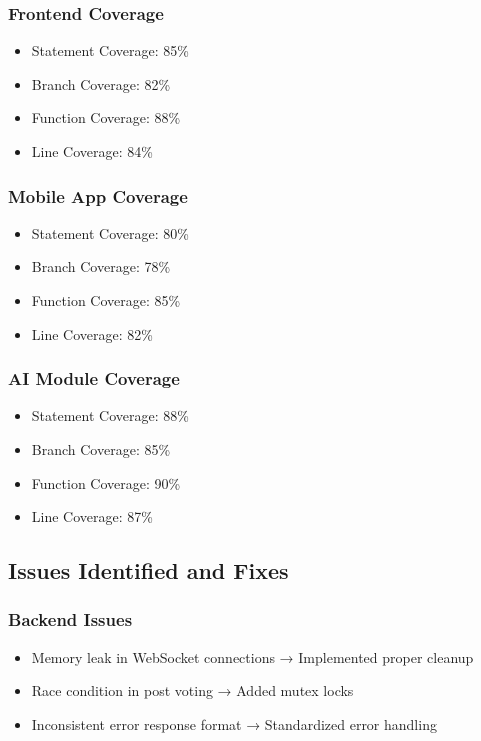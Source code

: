\subsubsection{Frontend Coverage}
\begin{itemize}
    \item Statement Coverage: 85\%
    \item Branch Coverage: 82\%
    \item Function Coverage: 88\%
    \item Line Coverage: 84\%
\end{itemize}

\subsubsection{Mobile App Coverage}
\begin{itemize}
    \item Statement Coverage: 80\%
    \item Branch Coverage: 78\%
    \item Function Coverage: 85\%
    \item Line Coverage: 82\%
\end{itemize}

\subsubsection{AI Module Coverage}
\begin{itemize}
    \item Statement Coverage: 88\%
    \item Branch Coverage: 85\%
    \item Function Coverage: 90\%
    \item Line Coverage: 87\%
\end{itemize}

\subsection{Issues Identified and Fixes}

\subsubsection{Backend Issues}
\begin{itemize}
    \item Memory leak in WebSocket connections → Implemented proper cleanup
    \item Race condition in post voting → Added mutex locks
    \item Inconsistent error response format → Standardized error handling
\end{itemize}

